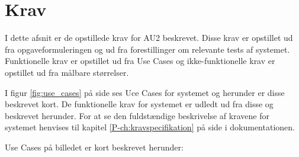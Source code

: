 \chapter{Krav}\label{ch:Krav} %

I dette afsnit er de opstillede krav for AU2 beskrevet.
Disse krav er opstillet ud fra opgaveformuleringen og ud fra forestillinger om relevante tests af systemet. Funktionelle krav er opstillet ud fra Use Cases og ikke-funktionelle krav er opstillet ud fra målbare størrelser.

I figur \ref{fig:use_cases} på side \pageref{fig:use_cases} ses Uce Cases for systemet og herunder er disse beskrevet kort. De funktionelle krav for systemet er udledt ud fra disse og beskrevet herunder. For at se den fuldstændige beskrivelse af kravene for systemet henvises til kapitel \ref{P-ch:kravspecifikation}  på side \pageref{P-ch:kravspecifikation} i dokumentationen.

Use Cases på billedet er kort beskrevet herunder:

